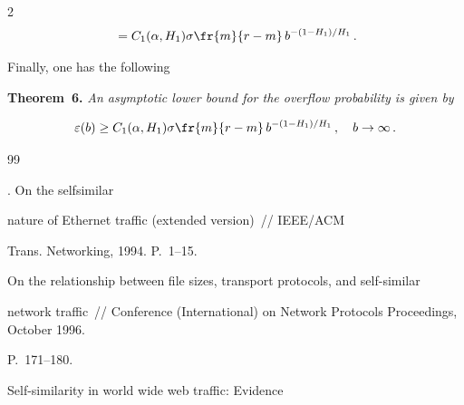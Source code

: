 \begin{multicols}{2}
\begin{multline*}
{}=

C_1 (\alpha , H_1 )\sigma \fr{m}{r-m} \, b^{-({1-H_1})/H_1} \,.

\end{multline*}

Finally, one has the following 



\pagebreak



\smallskip



\noindent

\textbf{Theorem~6.} \textit{An asymptotic lower bound for the overflow probability is given by}

$$

\varepsilon (b) \geq

C_1 (\alpha , H_1 )\sigma \fr{m}{r-m} \, b^{-({1-H_1})/{H_1} } \,, \quad

b\to\infty \,.

$$



\vspace*{-12pt}



{\small\frenchspacing

{%


\begin{thebibliography}{99}




. On the selfsimilar

nature of Ethernet traffic (extended version)~// IEEE/ACM

Trans. Networking, 1994. P.~1--15. 





On the relationship between file sizes, transport protocols, and self-similar 

network traffic~//  Conference (International) on Network Protocols Proceedings, October 1996. 

P.~171--180. 




 Self-similarity in world wide web traffic: Evidence 


\end{thebibliography}}}
\end{multicols}
